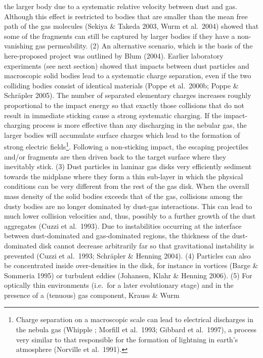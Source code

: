 the larger body due to a systematic relative velocity between dust
and gas. Although this effect is restricted to bodies that are
smaller than the mean free path of the gas molecules (Sekiya \&
Takeda 2003, Wurm et al.\ 2004) showed that some of the fragments
can still be captured by larger bodies if they have a
non-vanishing gas permeability. (2) An alternative scenario, which
is the basis of the here-proposed project was outlined by Blum
(2004). Earlier laboratory experiments (see next section) showed
that impacts between dust particles and macroscopic solid bodies
lead to a systematic charge separation, even if the two colliding
bodies consist of identical materials (Poppe et al.~2000b; Poppe
\& Schr\"apler 2005). The number of separated elementary charges
increases roughly proportional to the impact energy so that exactly those
collisions that do not result in immediate sticking cause a strong
systematic charging. If the impact-charging process is more effective than
any discharging in the nebular gas, the larger bodies will accumulate
surface charges which lead to the formation of strong electric
fields\footnote{Charge separation on a macroscopic scale can lead to
electrical discharges in the nebula gas (Whipple ; Morfill et
al.~1993; Gibbard et al.~1997), a process very similar to that responsible
for the formation of lightning in earth's atmosphere (Norville et
al.~1991).}. Following a non-sticking impact, the escaping projectiles
and/or fragments are then driven back to the target surface where they
inevitably stick. (3) Dust particles in laminar gas disks very efficiently
sediment towards the midplane where they form a thin sub-layer in which the
physical conditions can be very different from the rest of the gas
disk. When the overall mass density of the solid bodies exceeds that of the
gas, collisions among the dusty bodies are no longer dominated by dust-gas
interactions. This can lead to much lower collision velocities and, thus,
possibly to a further growth of the dust aggregates (Cuzzi et al.~1993). Due
to instabilities occurring at the interface between dust-dominated and
gas-dominated regions, the thickness of the dust-dominated disk cannot
decrease arbitrarily far so that gravitational instability is prevented
(Cuzzi et al.~1993; Schr\"apler \& Henning 2004). (4) Particles can also be
concentrated inside over-densities in the disk, for instance in vortices
(Barge \& Sommeria 1995) or turbulent eddies (Johansen, Klahr \& Henning
2006). (5) For optically thin environments (i.e.\ for a later evolutionary
stage) and in the presence of a (tenuous) gas component, Krauss \& Wurm
